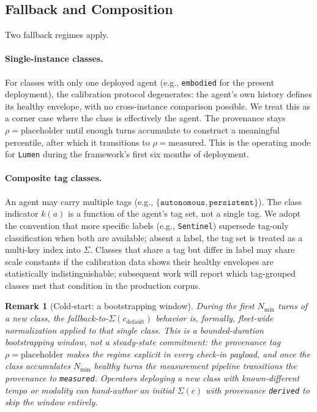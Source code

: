 \documentclass[11pt,twocolumn]{article}
\newtheorem{remark}[theorem]{Remark}
\begin{document}
\subsection{Fallback and Composition}

Two fallback regimes apply.

\paragraph{Single-instance classes.} For classes with only one
deployed agent (e.g., \texttt{embodied} for the present
deployment), the calibration protocol degenerates: the agent's own
history defines its healthy envelope, with no cross-instance
comparison possible. We treat this as a corner case where the
class is effectively the agent. The provenance stays
$\rho = \text{placeholder}$ until enough turns accumulate to
construct a meaningful percentile, after which it transitions to
$\rho = \text{measured}$. This is the operating mode for
\texttt{Lumen} during the framework's first six months of
deployment.

\paragraph{Composite tag classes.} An agent may carry multiple
tags (e.g., $\{\texttt{autonomous}, \texttt{persistent}\}$). The
class indicator $k(a)$ is a function of the agent's tag set, not
a single tag. We adopt the convention that more specific labels
(e.g., \texttt{Sentinel}) supersede tag-only classification when
both are available; absent a label, the tag set is treated as a
multi-key index into $\Sigma$. Classes that share a tag but
differ in label may share scale constants if the calibration data
shows their healthy envelopes are statistically indistinguishable;
subsequent work will report which tag-grouped classes met that
condition in the production corpus.

\begin{remark}[Cold-start: a bootstrapping window]
\label{rem:cold-start}
During the first $N_{\min}$ turns of a new class, the
fallback-to-$\Sigma(c_{\text{default}})$ behavior is, formally,
fleet-wide normalization applied to that single class. This is a
bounded-duration bootstrapping window, not a steady-state
commitment: the provenance tag $\rho = \text{placeholder}$ makes
the regime explicit in every check-in payload, and once the class
accumulates $N_{\min}$ healthy turns the measurement pipeline
transitions the provenance to \texttt{measured}. Operators
deploying a new class with known-different tempo or modality can
hand-author an initial $\Sigma(c)$ with provenance
\texttt{derived} to skip the window entirely.
\end{remark}
\end{document}
